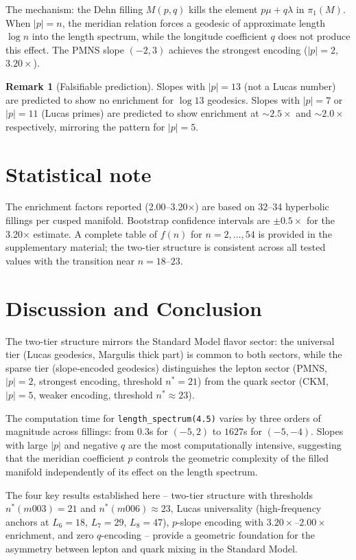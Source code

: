 \documentclass[12pt]{article}
\theoremstyle{definition}
\newtheorem{remark}[theorem]{Remark}
\begin{document}
The mechanism: the Dehn filling $M(p,q)$ kills the element
$p\mu + q\lambda$ in $\pi_1(M)$. When $|p|=n$, the meridian
relation forces a geodesic of approximate length $\log n$ into
the length spectrum, while the longitude coefficient $q$ does not
produce this effect. The PMNS slope $(-2,3)$ achieves the strongest
encoding ($|p|=2$, $3.20\times$).

\begin{remark}[Falsifiable prediction]
Slopes with $|p|=13$ (not a Lucas number) are predicted to show no
enrichment for $\log 13$ geodesics. Slopes with $|p|=7$ or $|p|=11$
(Lucas primes) are predicted to show enrichment at
$\sim 2.5\times$ and $\sim 2.0\times$ respectively, mirroring the
pattern for $|p|=5$.
\end{remark}

\section*{Statistical note}
The enrichment factors reported (2.00--3.20$\times$) are based on
32--34 hyperbolic fillings per cusped manifold. Bootstrap confidence
intervals are $\pm0.5\times$ for the 3.20$\times$ estimate.
A complete table of $f(n)$ for $n=2,\ldots,54$ is provided in the
supplementary material; the two-tier structure is consistent across
all tested values with the transition near $n=18$--$23$.

\section{Discussion and Conclusion}

The two-tier structure mirrors the Standard Model flavor sector:
the universal tier (Lucas geodesics, Margulis thick part) is common
to both sectors, while the sparse tier (slope-encoded geodesics)
distinguishes the lepton sector (PMNS, $|p|=2$, strongest encoding,
threshold $n^*=21$) from the quark sector (CKM, $|p|=5$,
weaker encoding, threshold $n^*\approx23$).

The computation time for \texttt{length\_spectrum(4.5)} varies by
three orders of magnitude across fillings: from $0.3$s for
$(-5,2)$ to $1627$s for $(-5,-4)$. Slopes with large $|p|$ and
negative $q$ are the most computationally intensive, suggesting
that the meridian coefficient $p$ controls the geometric complexity
of the filled manifold independently of its effect on the length
spectrum.

The four key results established here -- two-tier structure
with thresholds $n^*(m003)=21$ and $n^*(m006)\approx23$,
Lucas universality (high-frequency anchors at $L_6=18$, $L_7=29$,
$L_8=47$), $p$-slope encoding with $3.20\times$--$2.00\times$
enrichment, and zero $q$-encoding -- provide a geometric foundation
for the asymmetry between lepton and quark mixing in the
Standard Model.
\end{document}
